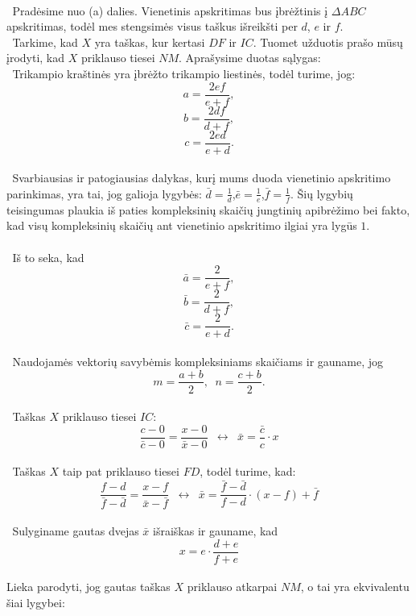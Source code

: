 \begin{sprendimas}
\\$\phantom{a}$Pradėsime nuo (a) dalies. Vienetinis apskritimas bus įbrėžtinis į $\Delta ABC$ apskritimas, todėl mes stengsimės visus taškus išreikšti per $d$, $e$ ir $f$.
\\  $\phantom{a}$Tarkime, kad $X$ yra taškas, kur kertasi $DF$ ir $IC$. Tuomet užduotis prašo mūsų įrodyti, kad $X$ priklauso tiesei $NM$.
        Aprašysime duotas sąlygas:
            \\$\phantom{a}$Trikampio kraštinės yra įbrėžto trikampio liestinės, todėl turime, jog:
                    $$ a =\frac{2ef}{e+f},$$
                     $$ b=\frac{2df}{d+f},$$
                    $$ c=\frac{2ed}{e+d}.$$
            \\ $\phantom{a}$Svarbiausias ir patogiausias dalykas, kurį mums duoda vienetinio apskritimo parinkimas, yra tai, jog
            galioja lygybės: $\bar{d}= \frac{1}{d}$,$\bar{e}= \frac{1}{e}$,$\bar{f}= \frac{1}{f}$. Šių 
            lygybių teisingumas plaukia iš paties kompleksinių skaičių jungtinių apibrėžimo bei fakto, kad visų kompleksinių 
            skaičių ant vienetinio apskritimo ilgiai yra lygūs $1$.\\
            \\ $\phantom{a}$Iš to seka, kad 
                  $$ \bar a =\frac{2}{e+f},$$
                  $$ \bar b=\frac{2}{d+f},$$
                  $$ \bar c=\frac{2}{e+d}.$$
           \\$\phantom{a}$Naudojamės vektorių savybėmis kompleksiniams skaičiams ir gauname, jog
                  $$ m=\frac{a+b}{2}, \phantom{a} n=\frac{c+b}{2}.$$
            \\$\phantom{a}$Taškas $X$ priklauso tiesei $IC$:
                     $$ \frac{c-0}{\bar{c}-0}=\frac{x-0}{\bar{x} - 0} {\phantom{a}}\leftrightarrow \phantom{a} \bar{x}= \frac{\bar{c}}{c}\cdot  x $$ 
           \\ $\phantom{a}$Taškas $X$ taip pat priklauso tiesei $FD$, todėl turime, kad:
                  \\ $$\frac{f-d}{\bar{f}-\bar{d}}=\frac{x-f}{\bar{x} - \bar{f}}  {\phantom{a}}\leftrightarrow \phantom{a} \bar{x}= \frac{ \bar{f} - \bar{d} }{f-d}\cdot  (x-f)+\bar{f} $$
      \\$\phantom{a}$Sulyginame gautas dvejas $\bar{x}$ išraiškas ir gauname, kad 
                   $$ x = e \cdot \frac{d+e}{f+e}$$
      \\Lieka parodyti, jog gautas taškas $X$ priklauso atkarpai $NM$, o tai yra ekvivalentu šiai lygybei:

\end{sprendimas}
